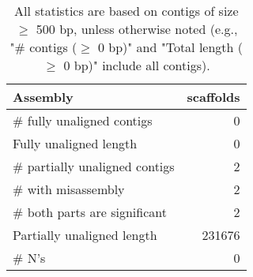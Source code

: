 \documentclass[12pt,a4paper]{article}
\begin{document}
\begin{table}[ht]
\begin{center}
\caption{All statistics are based on contigs of size $\geq$ 500 bp, unless otherwise noted (e.g., "\# contigs ($\geq$ 0 bp)" and "Total length ($\geq$ 0 bp)" include all contigs).}
\begin{tabular}{|l*{1}{|r}|}
\hline
Assembly & scaffolds \\ \hline
\# fully unaligned contigs & 0 \\ \hline
Fully unaligned length & 0 \\ \hline
\# partially unaligned contigs & 2 \\ \hline
\hspace{5mm}\# with misassembly & 2 \\ \hline
\hspace{5mm}\# both parts are significant & 2 \\ \hline
Partially unaligned length & 231676 \\ \hline
\# N's & 0 \\ \hline
\end{tabular}
\end{center}
\end{table}
\end{document}
